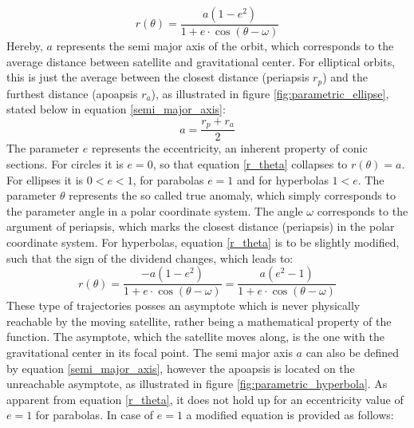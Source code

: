 \documentclass[11pt,a4paper]{article}
\begin{document}
	\begin{equation}\label{r_theta}
		r(\theta)=\frac{a(1-e^2)}{1+e\cdot\cos(\theta-\omega)}
	\end{equation}
	\noindent
	Hereby, $a$ represents the semi major axis of the orbit, which corresponds to the average distance between satellite and gravitational center. For elliptical orbits, this is just the average between the closest distance (periapsis $r_p$) and the furthest distance (apoapsis $r_a$), as illustrated in figure \ref{fig:parametric_ellipse}, stated below in equation \ref{semi_major_axis}:
	\begin{equation}\label{semi_major_axis}
		a = \frac{r_p + r_a}{2}
	\end{equation}
	\noindent
	The parameter $e$ represents the eccentricity, an inherent property of conic sections. For circles it is $e=0$, so that equation \ref{r_theta} collapses to $r(\theta)=a$. For ellipses it is $0 < e < 1$, for parabolas $e = 1$ and for hyperbolas $1 < e$. The parameter $\theta$ represents the so called true anomaly, which simply corresponds to the parameter angle in a polar coordinate system. \cite{orbital_nomenclature} \newline
	The angle $\omega$ corresponds to the argument of periapsis, which marks the closest distance (periapsis) in the polar coordinate system.\newline
	For hyperbolas, equation \ref{r_theta} is to be slightly modified, such that the sign of the dividend changes, which leads to: 
	\begin{equation}\label{r_theta_hyperbola}
		r(\theta)=\frac{-a(1-e^2)}{1+e\cdot\cos(\theta-\omega)} = \frac{a(e^2-1)}{1+e\cdot\cos(\theta-\omega)}
	\end{equation}
	\cite{hyperbolic_orbits} \newline
	These type of trajectories posses an asymptote which is never physically reachable by the moving satellite, rather being a mathematical property of the function. The asymptote, which the satellite moves along, is the one with the gravitational center in its focal point. The semi major axis $a$ can also be defined by equation \ref{semi_major_axis}, however the apoapsis is located on the unreachable asymptote, as illustrated in figure \ref{fig:parametric_hyperbola}.
	\newline
	As apparent from equation \ref{r_theta}, it does not hold up for an eccentricity value of $e = 1$ for parabolas. In case of $e = 1$ a modified equation is provided as follows:
	
\end{document}

